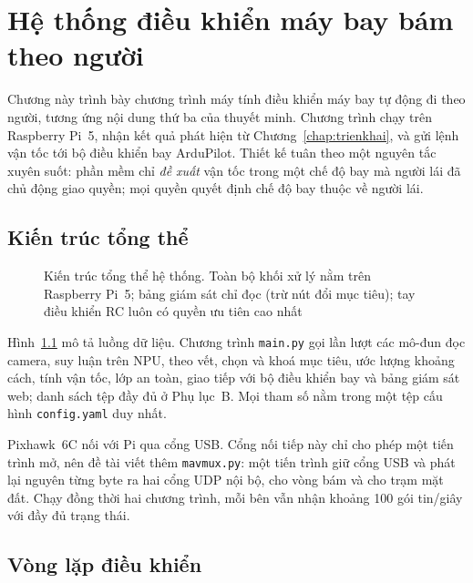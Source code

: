 \chapter{Hệ thống điều khiển máy bay bám theo người}
\label{chap:dieukhien}

Chương này trình bày chương trình máy tính điều khiển máy bay tự động đi theo người, tương ứng nội dung thứ ba của thuyết minh. Chương trình chạy trên Raspberry Pi~5, nhận kết quả phát hiện từ Chương~\ref{chap:trienkhai}, và gửi lệnh vận tốc tới bộ điều khiển bay ArduPilot. Thiết kế tuân theo một nguyên tắc xuyên suốt: phần mềm chỉ \textit{đề xuất} vận tốc trong một chế độ bay mà người lái đã chủ động giao quyền; mọi quyền quyết định chế độ bay thuộc về người lái.

\section{Kiến trúc tổng thể}

\begin{figure}[H]
\centering
\resizebox{0.88\textwidth}{!}{}
\caption{Kiến trúc tổng thể hệ thống. Toàn bộ khối xử lý nằm trên Raspberry Pi~5; bảng giám sát chỉ đọc (trừ nút đổi mục tiêu); tay điều khiển RC luôn có quyền ưu tiên cao nhất}
\label{fig:hethong}
\end{figure}

Hình~\ref{fig:hethong} mô tả luồng dữ liệu. Chương trình \texttt{main.py} gọi lần lượt các mô-đun đọc camera, suy luận trên NPU, theo vết, chọn và khoá mục tiêu, ước lượng khoảng cách, tính vận tốc, lớp an toàn, giao tiếp với bộ điều khiển bay và bảng giám sát web; danh sách tệp đầy đủ ở Phụ lục~B. Mọi tham số nằm trong một tệp cấu hình \texttt{config.yaml} duy nhất.

Pixhawk~6C nối với Pi qua cổng USB. Cổng nối tiếp này chỉ cho phép một tiến trình mở, nên đề tài viết thêm \texttt{mavmux.py}: một tiến trình giữ cổng USB và phát lại nguyên từng byte ra hai cổng UDP nội bộ, cho vòng bám và cho trạm mặt đất. Chạy đồng thời hai chương trình, mỗi bên vẫn nhận khoảng 100 gói tin/giây với đầy đủ trạng thái.

\section{Vòng lặp điều khiển}

